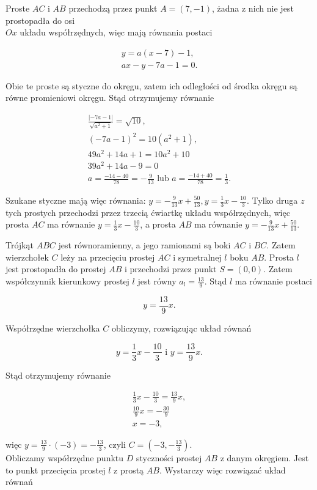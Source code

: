 \documentclass[10pt]{article}
\begin{document}
Proste $A C$ i $A B$ przechodzą przez punkt $A=(7,-1)$, żadna z nich nie jest prostopadła do osi\\
$O x$ układu współrzędnych, więc mają równania postaci

$$
\begin{gathered}
y=a(x-7)-1, \\
a x-y-7 a-1=0 .
\end{gathered}
$$

Obie te proste są styczne do okręgu, zatem ich odległości od środka okręgu są równe promieniowi okręgu. Stąd otrzymujemy równanie

$$
\begin{gathered}
\frac{|-7 a-1|}{\sqrt{a^{2}+1}}=\sqrt{10}, \\
(-7 a-1)^{2}=10\left(a^{2}+1\right), \\
49 a^{2}+14 a+1=10 a^{2}+10 \\
39 a^{2}+14 a-9=0 \\
a=\frac{-14-40}{78}=-\frac{9}{13} \text { lub } a=\frac{-14+40}{78}=\frac{1}{3} .
\end{gathered}
$$

Szukane styczne mają więc równania: $y=-\frac{9}{13} x+\frac{50}{13}, y=\frac{1}{3} x-\frac{10}{3}$. Tylko druga $z$ tych prostych przechodzi przez trzecią ćwiartkę układu współrzędnych, więc prosta $A C$ ma równanie $y=\frac{1}{3} x-\frac{10}{3}$, a prosta $A B$ ma równanie $y=-\frac{9}{13} x+\frac{50}{13}$.

Trójkąt $A B C$ jest równoramienny, a jego ramionami są boki $A C$ i $B C$. Zatem wierzchołek $C$ leży na przecięciu prostej $A C$ i symetralnej $l$ boku $A B$. Prosta $l$ jest prostopadła do prostej $A B$ i przechodzi przez punkt $S=(0,0)$. Zatem współczynnik kierunkowy prostej $l$ jest równy $a_{l}=\frac{13}{9}$. Stąd $l$ ma równanie postaci

$$
y=\frac{13}{9} x .
$$

Współrzędne wierzchołka $C$ obliczymy, rozwiązując układ równań

$$
y=\frac{1}{3} x-\frac{10}{3} \text { i } y=\frac{13}{9} x .
$$

Stąd otrzymujemy równanie

$$
\begin{gathered}
\frac{1}{3} x-\frac{10}{3}=\frac{13}{9} x, \\
\frac{10}{9} x=-\frac{30}{9} \\
x=-3,
\end{gathered}
$$

więc $y=\frac{13}{9} \cdot(-3)=-\frac{13}{3}$, czyli $C=\left(-3,-\frac{13}{3}\right)$.\\
Obliczamy współrzędne punktu $D$ styczności prostej $A B$ z danym okręgiem. Jest to punkt przecięcia prostej $l$ z prostą $A B$. Wystarczy więc rozwiązać układ równań
\end{document}
